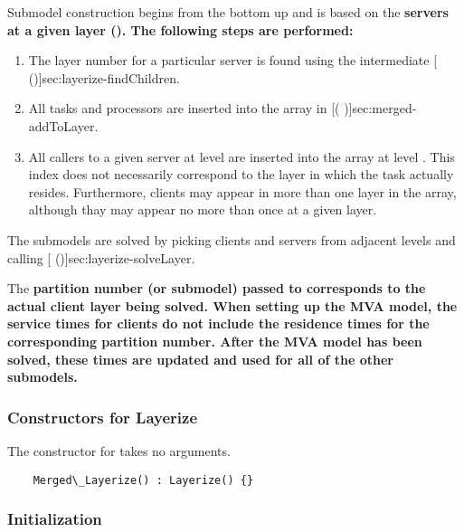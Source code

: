 Submodel construction begins from the bottom up and is based on the
\bf{servers} at a given layer ().  The following steps are
performed:
\begin{enumerate}
\item The layer number for a particular server is found using the
  intermediate [
  (\Sec\Ref)]{sec:layerize-findChildren}.
\item All tasks and processors are inserted into the 
  array in [(
  \Sec\Ref)]{sec:merged-addToLayer}.
\item All callers to a given server at level  are inserted
  into the  array at level .  This index does
  not necessarily correspond to the layer in which the task actually
  resides.  Furthermore, clients may appear in more than one layer in
  the  array, although thay may appear no more than once
  at a given layer.
\end{enumerate}
The submodels are solved by picking clients and servers from adjacent
levels and calling
[ (\Sec\Ref)]{sec:layerize-solveLayer}.  

The \bf{partition number} (or submodel) passed to
 corresponds to the
actual client layer being solved.  When setting up the MVA model, the
service times for clients do not include the residence times for the
corresponding partition number.  After the MVA model has been solved,
these times are updated and used for all of the other submodels.

\subsubsection{Constructors for Layerize}

The constructor for  takes no arguments.  

\begin{verbatim}
    Merged\_Layerize() : Layerize() {}
\end{verbatim}

\subsubsection{Initialization}


